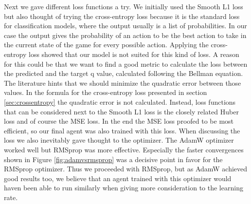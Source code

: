 Next we gave different loss functions a try. We initially used the Smooth L1 loss but also thought of trying the cross-entropy loss because it is the standard loss for classification models, where the output usually is a list of probabilities. In our case the output gives the probability of an action to be the best action to take in the current state of the game for every possible action. Applying the cross-entropy loss showed that our model is not suited for this kind of loss. A reason for this could be that we want to find a good metric to calculate the loss between the predicted and the target q value, calculated following the Bellman equation. The literature hints that we should minimize the quadratic error between those values. In the formula for the cross-entropy loss presented in section \ref{sec:crossentropy} the quadratic error is not calculated. Instead, loss functions that can be considered next to the Smooth L1 loss is the closely related Huber loss and of course the MSE loss. In the end the MSE loss proofed to be most efficient, so our final agent was also trained with this loss. When discussing the loss we also inevitably gave thought to the optimizer. The AdamW optimizer worked well but RMSprop was more effective. Especially the faster convergences shown in Figure \ref{fig:adamvsrmsprop} was a decisive point in favor for the RMSprop optimizer. Thus we proceeded with RMSprop, but as AdamW achieved good results too, we believe that an agent trained with this optimizer would haven been able to run similarly when giving more consideration to the learning rate.
